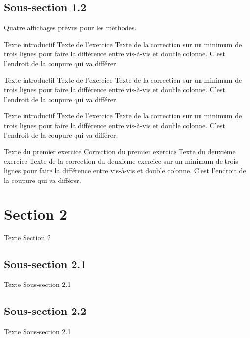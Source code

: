 \documentclass[nocrop]{sesamanuel}
\begin{document}
\subsection{Sous-section 1.2}
Quatre affichages prévus pour les méthodes.

\begin{methode}
  Texte introductif
  \exercice
  Texte de l’exercice
  \correction
  Texte de la correction sur un minimum de trois lignes pour faire la
  différence entre vis-à-vis et double colonne. C’est l’endroit de la
  coupure qui va différer.
\end{methode}

\begin{methode*1}
  Texte introductif
  \exercice
  Texte de l’exercice
  \correction
  Texte de la correction sur un minimum de trois lignes pour faire la
  différence entre vis-à-vis et double colonne. C’est l’endroit de la
  coupure qui va différer.
\end{methode*1}

\begin{methode*2}
  Texte introductif
  \exercice
  Texte de l’exercice
  \correction
  Texte de la correction sur un minimum de trois lignes pour faire la
  différence entre vis-à-vis et double colonne. C’est l’endroit de la
  coupure qui va différer.
\end{methode*2}

\begin{methode*2*2}
  \exercice
  \label{methode-exemple}
  Texte du premier exercice
  \correction
  Correction du premier exercice
  \exercice
  Texte du deuxième exercice
  \correction
  Texte de la correction du deuxième exercice sur un minimum de trois
  lignes pour faire la différence entre vis-à-vis et double
  colonne. C’est l’endroit de la coupure qui va différer.
\end{methode*2*2}

\section{Section 2}
Texte Section 2
\subsection{Sous-section 2.1}
Texte Sous-section 2.1
\subsection{Sous-section 2.2}
Texte Sous-section 2.1
\end{document}

